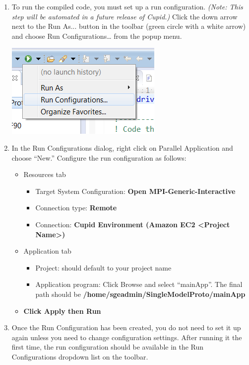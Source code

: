 \documentclass[oneside,11pt]{memoir}
\begin{document}
\begin{enumerate}
\item To run the compiled code, you must set up a run configuration.  \emph{(Note: This step will be automated in a future release of Cupid.)}  Click the down arrow next to the Run As... button in the toolbar (green circle with a white arrow) and choose Run Configurations… from the popup menu.

\parbox{\linewidth}{\centering
  \includegraphics{figs/cloudrun_fig3.png}
}

\item In the Run Configurations dialog, right click on Parallel Application and choose ``New.''  Configure the run configuration as follows:

\begin{itemize}
\item Resources tab
	\begin{itemize}
	\item Target System Configuration: \textbf{Open MPI-Generic-Interactive}
	\item Connection type: \textbf{Remote}
	\item Connection: \textbf{Cupid Environment (Amazon EC2  <Project Name>)}
	\end{itemize}
\item Application tab
	\begin{itemize}
	\item Project: should default to your project name
	\item Application program: Click Browse and select ``mainApp''.  The final path should be \textbf{/home/sgeadmin/SingleModelProto/mainApp}
	\end{itemize}
\item \textbf{Click Apply then Run}
\end{itemize}

\item Once the Run Configuration has been created, you do not need to set it up again unless you need to change configuration settings.  After running it the first time, the run configuration should be available in the Run Configurations dropdown list on the toolbar.


\end{enumerate}
\end{document}
